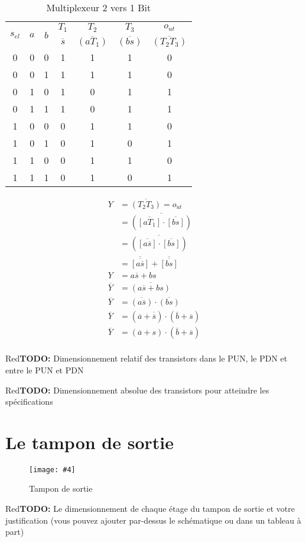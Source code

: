 \documentclass[a11paper]{article}
\newcommand{\todo}[1]{\begin{color}{Red}\textbf{TODO:} #1\end{color}}
\newcommand{\quicktab}[4]{
  \begin{table}[H]
    \centering
    \caption{#1}
    \label{tab:#2}
    \begin{tabular}{#3}
      #4
    \end{tabular}
  \end{table}
}
\newcommand{\quickfig}[4]{
\begin{figure}[H]
  \centering
  \texttt{[image: \#4]}
  \caption{#1}
  \label{fig:#2}
\end{figure}
}
\begin{document}
\quicktab{Multiplexeur 2 vers 1 Bit}{mux2x1b}{ccccccc}{
  \toprule
  \multirow{2}{*}{$s_{el}$} &
  \multirow{2}{*}{$a$} &
  \multirow{2}{*}{$b$} &
  $T_1$ &
  $T_2$ &
  $T_3$ &
  $o_{ut}$ \\
  & & &
  $\overline{s}$ &
  $\overline{(aT_1)}$ &
  $\overline{(bs)}$ &
  $\overline{(T_2T_3)}$ \\
  \midrule
  0&0&0&1&1&1&0 \\
  0&0&1&1&1&1&0 \\
  0&1&0&1&0&1&1 \\
  0&1&1&1&0&1&1 \\
  1&0&0&0&1&1&0 \\
  1&0&1&0&1&0&1 \\
  1&1&0&0&1&1&0 \\
  1&1&1&0&1&0&1
  \\
  \bottomrule
}

\begin{align}
  Y &= \overline{(T_2T_3)} = o_{ut}  \\
  &= \overline{(\overline{[aT_1]}\cdot\overline{[bs]} )} \\
  &= \overline{(\overline{[a\overline{s}]}\cdot\overline{[bs]} )} \\
  &= \overline{\overline{[a\overline{s}]}} + \overline{\overline{[bs]}} \\
  Y &= a\overline{s} + bs \\
  \overline{Y} &= \overline{(a\overline{s} + bs)} \\
  \overline{Y} &= \overline{(a\overline{s})} \cdot \overline{(bs)} \\
  \overline{Y} &= (\overline{a}+\overline{\overline{s}}) \cdot (\overline{b}+\overline{s}) \\
  \overline{Y} &= (\overline{a}+s) \cdot (\overline{b}+\overline{s}) \\
\end{align}

\todo{Dimensionnement relatif des transistors dans le PUN, le PDN et entre le PUN et PDN}
\todo{Dimensionnement absolue des transistors pour atteindre les spécifications}

\newpage
\section{Le tampon de sortie}
\quickfig{Tampon de sortie}{pad_buffer}{.5}{assets/pad_buffer.png}
\todo{Le dimensionnement de chaque étage du tampon de sortie et votre justification (vous
pouvez ajouter par-dessus le schématique ou dans un tableau à part)}
\end{document}
